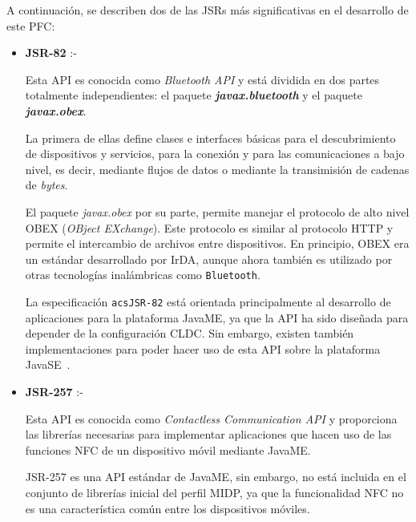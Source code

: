 A continuación, se describen dos de las \acs{JSR}s más significativas
en el desarrollo de este \acs{PFC}:

\begin{itemize}
\item \textbf{\acs{JSR}-82} :- %

Esta \acs{API} es conocida como \emph{Bluetooth \acs{API}} y está dividida en
dos partes totalmente independientes: el paquete
\emph{\textbf{javax.bluetooth}} y el paquete \emph{\textbf{javax.obex}}.

La primera de ellas define clases e interfaces básicas para el descubrimiento
de dispositivos y servicios, para la conexión y para las comunicaciones a bajo 
nivel, es decir, mediante flujos de datos o mediante la transimisión de cadenas
de \emph{bytes}.

El paquete \emph{javax.obex} por su parte, permite manejar el protocolo de
alto nivel \acs{OBEX} (\emph{OBject EXchange}). Este protocolo es similar
al protocolo \acs{HTTP} y permite el intercambio de archivos entre
dispositivos. En principio, \acs{OBEX} era un estándar desarrollado por
\acs{IrDA}, aunque ahora también es utilizado por otras tecnologías
inalámbricas como \texttt{Bluetooth}.

La especificación \texttt{acs{JSR}-82} está orientada principalmente al 
desarrollo de aplicaciones para la plataforma \acs{JavaME}, ya que la \acs{API} 
ha sido diseñada para depender de la configuración \acs{CLDC}. Sin embargo, 
existen también implementaciones para poder hacer uso de esta \acs{API} sobre
la plataforma \acs{JavaSE}~\cite{bib:jsr82}.

\item \textbf{\acs{JSR}-257} :- %

Esta \acs{API} es conocida como \emph{Contactless Communication \acs{API}} y
proporciona las librerías necesarias para implementar aplicaciones que
hacen uso de las funciones \acs{NFC} de un dispositivo móvil mediante
\acs{JavaME}.

\acs{JSR}-257 es una \acs{API} estándar de \acs{JavaME}, sin embargo, no
está incluida en el conjunto de librerías inicial del perfil \acs{MIDP}, ya
que la funcionalidad \acs{NFC} no es una característica común entre los
dispositivos móviles.


\end{itemize}
